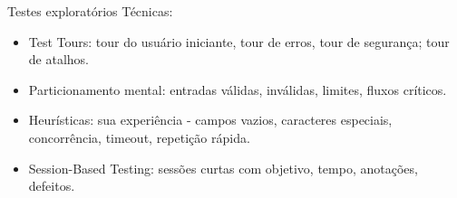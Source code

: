 
\begin{frame}{Testes exploratórios}
    Técnicas:
    \begin{itemize}
        \item Test Tours: tour do usuário iniciante, tour de erros, tour de segurança; tour de atalhos.
        \item Particionamento mental: entradas válidas, inválidas, limites, fluxos críticos.
        \item Heurísticas: sua experiência - campos vazios, caracteres especiais, concorrência, timeout, repetição rápida.
        \item Session-Based Testing: sessões curtas com objetivo, tempo, anotações, defeitos.
    \end{itemize}
\end{frame}
